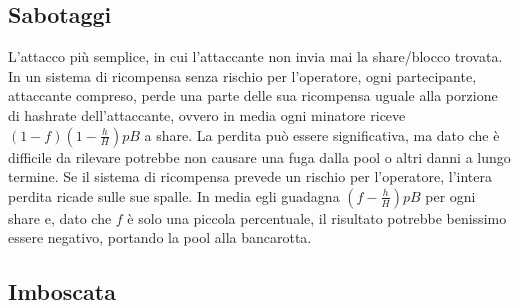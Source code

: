 \subsection{Sabotaggi}

L'attacco più semplice, in cui l'attaccante non invia mai la share/blocco trovata.
In un sistema di ricompensa senza rischio per l'operatore, ogni partecipante, attaccante compreso, perde una parte delle sua ricompensa uguale alla porzione di hashrate dell'attaccante, ovvero in media ogni minatore riceve $(1-f)\left(1-\frac{h}{H}\right)pB$ a share. La perdita può essere significativa, ma dato che è difficile da rilevare potrebbe non causare una fuga dalla pool o altri danni a lungo termine.
Se il sistema di ricompensa prevede un rischio per l'operatore, l'intera perdita ricade sulle sue spalle. In media egli guadagna $\left(f-\frac{h}{H}\right)pB$ per ogni share e, dato che $f$ è solo una piccola percentuale, il risultato potrebbe benissimo essere negativo, portando la pool alla bancarotta.

\subsection{Imboscata}

